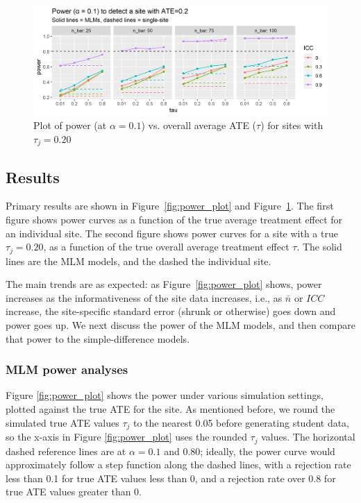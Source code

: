 \documentclass[]{article}
\begin{document}
\begin{figure}[ht]
	\centering
	\includegraphics[width=\textwidth]{power_plot_comp_ATE02}
	\caption{Plot of power (at $\alpha = 0.1$) vs. overall average ATE ($\tau$) for sites with $\tau_j = 0.20$}
	\label{fig:power_plot_ATE02}
\end{figure}


\subsection{Results}


Primary results are shown in Figure~\ref{fig:power_plot} and Figure~\ref{fig:power_plot_ATE02}.
The first figure shows power curves as a function of the true average treatment effect for an individual site.
The second figure shows power curves for a site with a true $\tau_j = 0.20$, as a function of the true overall average treatment effect $\tau$.
The solid lines are the MLM models, and the dashed the individual site.

The main trends are as expected: as Figure~\ref{fig:power_plot} shows, power increases as the informativeness of the site data increases, i.e., as $\bar{n}$ or $ICC$ increase, the site-specific standard error (shrunk or otherwise) goes down and power goes up.
We next discuss the power of the MLM models, and then compare that power to the simple-difference models.


\subsubsection{MLM power analyses}

Figure \ref{fig:power_plot} shows the power under various simulation settings, plotted against the true ATE for the site.
As mentioned before, we round the simulated true ATE values $\tau_j$ to the nearest 0.05 before generating student data, so the x-axis in Figure \ref{fig:power_plot} uses the rounded $\tau_j$ values.
The horizontal dashed reference lines are at $\alpha = 0.1$ and $0.80$; ideally, the power curve would approximately follow a step function along the dashed lines, with a rejection rate less than 0.1 for true ATE values less than 0, and a rejection rate over 0.8 for true ATE values greater than 0.
\end{document}
